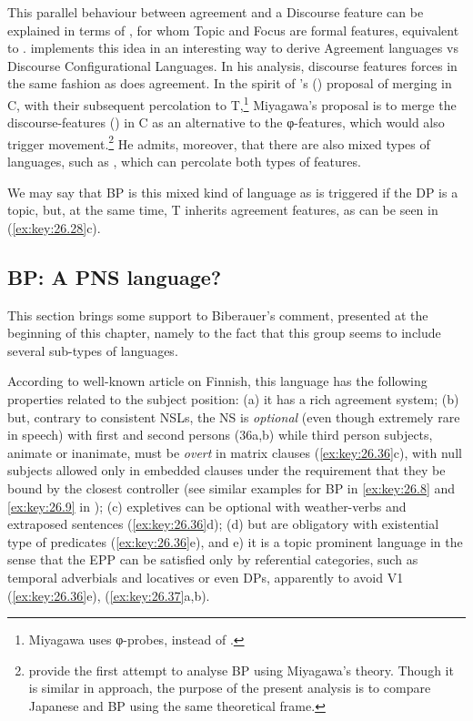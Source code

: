 \documentclass[output=paper]{langsci/langscibook}
\begin{document}
This parallel behaviour between agreement and a Discourse feature can be
explained in terms of \citet{HolNik2002}, for whom Topic and
Focus are
formal features, equivalent to .  implements
this idea in an interesting way to derive Agreement languages vs Discourse
Configurational Languages.  In his analysis, discourse features forces 
in the same fashion as does agreement. In the spirit of
\citeauthor{Chomsky2007}’s (\citeyear{Chomsky2007,Chomsky2008})
proposal of merging  in C, with their subsequent percolation to
T,\footnote{Miyagawa uses φ-probes, instead of .} Miyagawa’s proposal
is to merge the discourse-features () in C as an  alternative  to the
φ{}-features, which would also trigger
movement.\footnote{\textcite{NavesEtAl2013} provide the first attempt to analyse
    \gls{BP} using Miyagawa’s theory.  Though  it is
    similar in approach, the purpose of the present analysis  is to compare
Japanese and \gls{BP} using the same theoretical
frame.} He admits, moreover, that there are also mixed types of languages,
such as , which can percolate both types of features.

We may say that \gls{BP} is this mixed kind of
language as  is triggered if the DP is a topic, but, at the same time, T
inherits agreement features, as can be seen in (\ref{ex:key:26.28}c).

\subsection{BP: A PNS language?}\label{sec:key:26.3.3}

This section brings some support to Biberauer’s comment, presented at the
beginning of this chapter, namely to the fact that this group seems
to include several sub-types of languages.

According to  well-known article on Finnish, this language
has the following properties related to the subject position: (a) it has a rich
agreement system; (b) but, contrary to consistent \gls{NSL}s, the NS is
\emph{optional} (even though extremely rare in speech) with first and second
persons (36a,b) while third person subjects, animate or inanimate, must be
\emph{overt} in matrix clauses (\ref{ex:key:26.36}c), with null subjects
allowed only in embedded clauses under the requirement that they be bound by
the closest controller (see similar examples for \gls{BP} in \eqref{ex:key:26.8} and \eqref{ex:key:26.9} in
); (c) expletives can be optional with weather-verbs and
extraposed sentences (\ref{ex:key:26.36}d); (d) but are obligatory with
existential type of predicates  (\ref{ex:key:26.36}e), and e) it is a topic
prominent language in the sense that the \gls{EPP} can be satisfied only by
referential categories, such as temporal adverbials and locatives or even DPs,
apparently to avoid V1 (\ref{ex:key:26.36}e), (\ref{ex:key:26.37}a,b).
\end{document}
